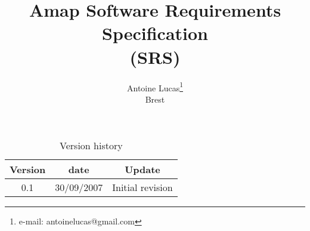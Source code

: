 \documentclass[twoside,10pt]{article}
\title{\bf Amap Software Requirements Specification\\ (SRS)}
\author{Antoine Lucas\thanks{e-mail: antoinelucas@gmail.com}\\[0.2cm]
\normalsize Brest
}
\begin{document}
\maketitle

\sloppy



\begin{table}[htb]
\centering
\begin{tabular}{ccc}
\hline
\bf Version & \bf date & \bf Update \\
\hline
\hline
0.1 & 30/09/2007  & Initial revision\\
\hline
\end{tabular}
\caption{Version history}
\end{table}
\end{document}
